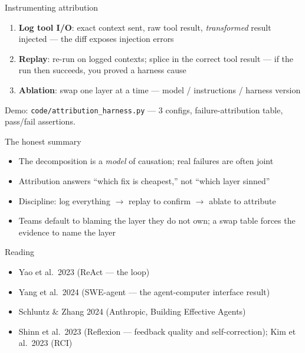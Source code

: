 \documentclass[aspectratio=169,11pt]{beamer}
\begin{document}
\begin{frame}{Instrumenting attribution}
\begin{enumerate}
\item \textbf{Log tool I/O}: exact context sent, raw tool result, \emph{transformed} result injected --- the diff exposes injection errors
\item \textbf{Replay}: re-run on logged contexts; splice in the correct tool result --- if the run then succeeds, you proved a harness cause
\item \textbf{Ablation}: swap one layer at a time --- model / instructions / harness version
\end{enumerate}

\vspace{0.5em}
Demo: \texttt{code/attribution\_harness.py} --- 3 configs, failure-attribution table, pass/fail assertions.
\end{frame}

\begin{frame}{The honest summary}
\begin{itemize}
\item The decomposition is a \emph{model} of causation; real failures are often joint
\item Attribution answers ``which fix is cheapest,'' not ``which layer sinned''
\item Discipline: log everything $\to$ replay to confirm $\to$ ablate to attribute
\item Teams default to blaming the layer they do not own; a swap table forces the evidence to name the layer
\end{itemize}
\end{frame}

\begin{frame}{Reading}
\begin{itemize}
\item Yao et al.\ 2023 (ReAct --- the loop)
\item Yang et al.\ 2024 (SWE-agent --- the agent-computer interface result)
\item Schluntz \& Zhang 2024 (Anthropic, Building Effective Agents)
\item Shinn et al.\ 2023 (Reflexion --- feedback quality and self-correction); Kim et al.\ 2023 (RCI)
\end{itemize}
\end{frame}
\end{document}
